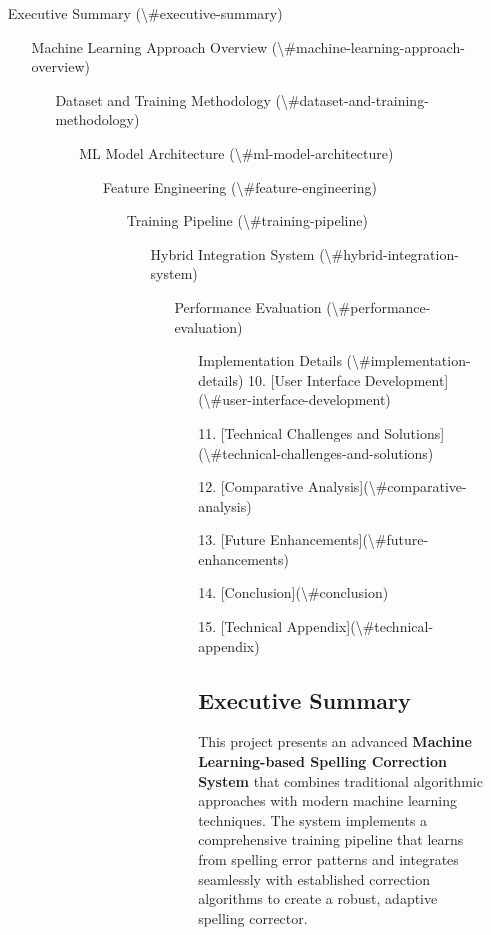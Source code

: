 \documentclass[12pt,a4paper]{article}
\begin{document}
\begin{enumerate}
\item [Executive Summary](\textbackslash{}#executive-summary)
\begin{enumerate}
\item [Machine Learning Approach Overview](\textbackslash{}#machine-learning-approach-overview)
\begin{enumerate}
\item [Dataset and Training Methodology](\textbackslash{}#dataset-and-training-methodology)
\begin{enumerate}
\item [ML Model Architecture](\textbackslash{}#ml-model-architecture)
\begin{enumerate}
\item [Feature Engineering](\textbackslash{}#feature-engineering)
\begin{enumerate}
\item [Training Pipeline](\textbackslash{}#training-pipeline)
\begin{enumerate}
\item [Hybrid Integration System](\textbackslash{}#hybrid-integration-system)
\begin{enumerate}
\item [Performance Evaluation](\textbackslash{}#performance-evaluation)
\begin{enumerate}
\item [Implementation Details](\textbackslash{}#implementation-details)
10. [User Interface Development](\textbackslash{}#user-interface-development)

11. [Technical Challenges and Solutions](\textbackslash{}#technical-challenges-and-solutions)

12. [Comparative Analysis](\textbackslash{}#comparative-analysis)

13. [Future Enhancements](\textbackslash{}#future-enhancements)

14. [Conclusion](\textbackslash{}#conclusion)

15. [Technical Appendix](\textbackslash{}#technical-appendix)



\subsection{Executive Summary}


This project presents an advanced \textbf{Machine Learning-based Spelling Correction System} that combines traditional algorithmic approaches with modern machine learning techniques. The system implements a comprehensive training pipeline that learns from spelling error patterns and integrates seamlessly with established correction algorithms to create a robust, adaptive spelling corrector.



\end{enumerate}
\end{enumerate}
\end{enumerate}
\end{enumerate}
\end{enumerate}
\end{enumerate}
\end{enumerate}
\end{enumerate}
\end{enumerate}
\end{document}
